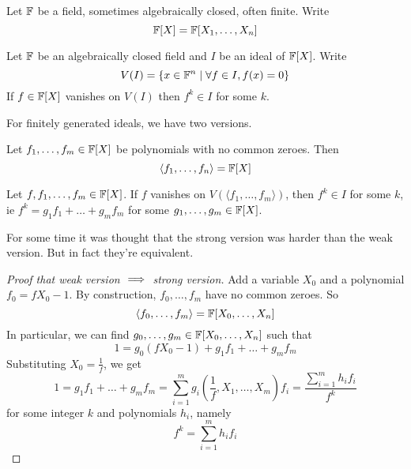 \documentclass{article}
\begin{document}
Let $\mathbb F$ be a field, sometimes algebraically closed, often finite. Write
$$\mathbb F[X] = \mathbb F[X_1, \dots, X_n]$$

\begin{thm}
  Let $\mathbb F$ be an algebraically closed field and $I$ be an ideal of $\mathbb F[X]$. Write
  $$V(I) = \{x \in \mathbb F^n \mid \forall f \in I, f(x) = 0\}$$
  If $f \in \mathbb F[X]$ vanishes on $V(I)$ then $f^k \in I$ for some $k$.
\end{thm}

For finitely generated ideals, we have two versions.

\begin{thm}
  Let $f_1, \dots, f_m \in \mathbb F[X]$ be polynomials with no common zeroes. Then
  $$\langle f_1, \dots, f_n\rangle = \mathbb F[X]$$
\end{thm}

\begin{thm}
  Let $f, f_1, \dots, f_m \in \mathbb F[X]$. If $f$ vanishes on $V(\langle f_1, \dots, f_m\rangle)$, then $f^k \in I$ for some $k$, ie $f^k = g_1f_1 + \dots + g_mf_m$ for some $g_1, \dots, g_m \in \mathbb F[X]$.
\end{thm}

For some time it was thought that the strong version was harder than the weak version. But in fact they're equivalent.

\begin{proof}[Proof that weak version $\implies$ strong version]
  Add a variable $X_0$ and a polynomial $f_0 = fX_0 - 1$. By construction, $f_0, \dots, f_m$ have no common zeroes. So
  $$\langle f_0, \dots, f_m\rangle = \mathbb F[X_0, \dots, X_n]$$
  In particular, we can find $g_0, \dots, g_m \in \mathbb F[X_0, \dots, X_n]$ such that
  $$1 = g_0(fX_0 - 1) + g_1f_1 + \dots + g_m f_m$$
  Substituting $X_0 = \frac 1f$, we get
  $$1 = g_1f_1 + \dots + g_m f_m = \sum_{i = 1}^m g_i\left(\frac 1f, X_1, \dots, X_m\right)f_i = \frac{\sum_{i = 1}^m h_if_i}{f^k}$$
  for some integer $k$ and polynomials $h_i$, namely
  $$f^k = \sum_{i = 1}^m h_if_i$$
\end{proof}

\newlec

\printindex
\end{document}
